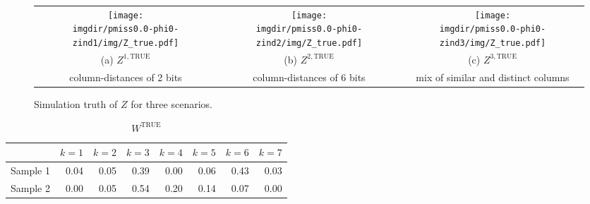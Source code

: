 \documentclass[10pt]{article} %
\def\true{\text{TRUE}}
\def\imgdir{results}
\begin{document}
\begin{figure}[H]
  \begin{center}  %
    \begin{tabular}{ccc}
      \texttt{[image: \\imgdir/pmiss0.0-phi0-zind1/img/Z\_true.pdf]} &
      \texttt{[image: \\imgdir/pmiss0.0-phi0-zind2/img/Z\_true.pdf]} &
      \texttt{[image: \\imgdir/pmiss0.0-phi0-zind3/img/Z\_true.pdf]} \\
      (a) $Z^{1,\true}$ &
      (b) $Z^{2,\true}$ &
      (c) $Z^{3,\true}$ \\
      column-distances of 2 bits &
      column-distances of 6 bits &
      mix of similar and distinct columns \\
    \end{tabular}
  \end{center}
  \caption{Simulation truth of $Z$ for three scenarios.}
  \label{fig:Z-true}
\end{figure}

\begin{table}[ht]
  \centering
  \begin{tabular}{rrrrrrrr}
    \hline
    & $k=1$ & $k=2$ & $k=3$ & $k=4$ & $k=5$ & $k=6$ & $k=7$ \\
    \hline
    Sample 1 & 0.04 & 0.05 & 0.39 & 0.00 & 0.06 & 0.43 & 0.03 \\
    Sample 2 & 0.00 & 0.05 & 0.54 & 0.20 & 0.14 & 0.07 & 0.00 \\
    \hline
  \end{tabular}
  \caption{$W^\true$}
  \label{tab:W-true}
\end{table}
\end{document}
